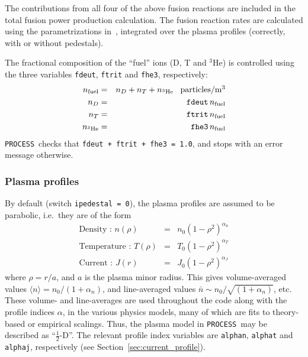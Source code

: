 \documentclass[11pt,a4paper]{report}
\newcommand{\process}{\mbox{\texttt{PROCESS}}}
\begin{document}
The contributions from all four of the above fusion reactions are included in
the total fusion power production calculation. The fusion reaction rates are
calculated using the parametrizations in~\cite{BoschHale}, integrated over the
plasma profiles (correctly, with or without pedestals).

The fractional composition of the ``fuel'' ions (D, T and $^3$He) is
controlled using the three variables \texttt{fdeut}, \texttt{ftrit} and
\texttt{fhe3}, respectively:
\begin{eqnarray*}
n_{\mbox{\scriptsize fuel}} & = & n_D + n_T + n_{\mathrm{^{3}He}}  \;\;\; \mbox{particles/m$^3$} \\
n_D & = & \mathtt{fdeut} \, n_{\mbox{\scriptsize fuel}} \\
n_T & = & \mathtt{ftrit} \, n_{\mbox{\scriptsize fuel}} \\
n_{\mathrm{^{3}He}} & = & \mathtt{fhe3} \, n_{\mbox{\scriptsize fuel}}
\end{eqnarray*}
\process\ checks that \texttt{fdeut + ftrit + fhe3 = 1.0}, and stops with an
error message otherwise.

\subsubsection{Plasma profiles}

By default  (switch \texttt{ipedestal = 0}), the plasma
profiles are assumed to be parabolic, i.e.\ they are of the form
\begin{eqnarray}
\mbox{Density : } n(\rho) & = & n_0 \left( 1 - \rho^2 \right)^{\alpha_n} \\
\mbox{Temperature : } T(\rho) & = & T_0 \left( 1 - \rho^2 \right)^{\alpha_T} \\
\mbox{Current : } J(r) & = & J_0 \left( 1 - \rho^2 \right)^{\alpha_J}
\end{eqnarray}
where $\rho = r/a$, and $a$ is the plasma minor radius. This gives
volume-averaged values $\langle n \rangle = n_0 / (1+\alpha_n)$, and
line-averaged values $\bar{n} \sim n_0 / \sqrt{(1+\alpha_n)}$, etc.  These
volume- and line-averages are used throughout the code along with the profile
indices $\alpha$, in the various physics models, many of which are fits to
theory-based or empirical scalings. Thus, the plasma model in \process\ may
be described as ``$\frac{1}{2}$-D''.  The relevant profile index variables are
\texttt{alphan}, \texttt{alphat} and \texttt{alphaj}, respectively (see
Section~\ref{sec:current_profile}).
\end{document}
